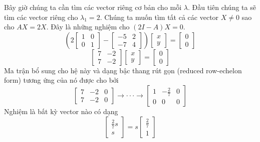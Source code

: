 Bây giờ chúng ta cần tìm các vector riêng cơ bản cho mỗi $\lambda$. Đầu tiên chúng ta sẽ tìm các vector riêng cho $\lambda_{1}=2$. Chúng ta muốn tìm tất cả các vector $X\ne0$ sao cho $AX=2X$. Đây là những nghiệm cho $(2I-A)X=0$.
\begin{equation*}
\left(2\begin{bmatrix}1&0\\ 0&1\end{bmatrix}-\begin{bmatrix}-5&2\\ -7&4\end{bmatrix}\right)\begin{bmatrix}x\\ y\end{bmatrix}=\begin{bmatrix}0\\ 0\end{bmatrix}
\end{equation*}
\begin{equation*}
\begin{bmatrix}7&-2\\ 7&-2\end{bmatrix}\begin{bmatrix}x\\ y\end{bmatrix}=\begin{bmatrix}0\\ 0\end{bmatrix}
\end{equation*}
Ma trận bổ sung cho hệ này và dạng bậc thang rút gọn (reduced row-echelon form) tương ứng của nó được cho bởi
\begin{equation}
\begin{bmatrix}7&-2&0\\ 7&-2&0\end{bmatrix}\rightarrow\cdot\cdot\cdot\rightarrow\begin{bmatrix}1&-\frac{2}{7}&0\\ 0&0&0\end{bmatrix}
\end{equation}
Nghiệm là bất kỳ vector nào có dạng
\begin{equation*}
\begin{bmatrix}\frac{2}{7}s\\ s\end{bmatrix}=s\begin{bmatrix}\frac{2}{7}\\ 1\end{bmatrix}
\end{equation*}
